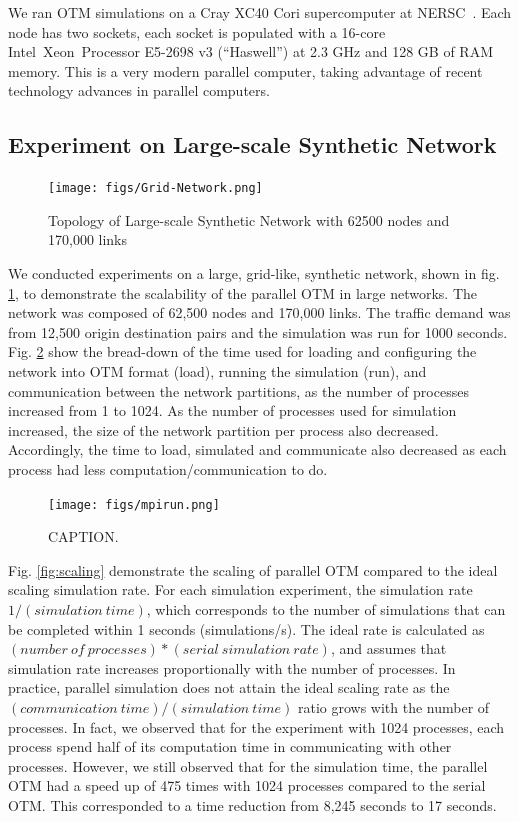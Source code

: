 We ran OTM simulations on a Cray XC40 Cori supercomputer at NERSC~\cite{Cori}. Each node has two sockets, each socket is
populated with a 16-core Intel\textcopyright~Xeon\texttrademark~Processor E5-2698 v3 (``Haswell'') at 2.3 GHz and 128 GB of RAM memory. This is a very modern parallel computer, taking advantage of recent technology advances in parallel computers.

\subsection{Experiment on Large-scale Synthetic Network}
\begin{figure}[h!]
    \centering
    \texttt{[image: figs/Grid-Network.png]}
    \caption{Topology of Large-scale Synthetic Network with 62500 nodes and 170,000 links}
    \label{fig:Synthetic_Network}
\end{figure}

We conducted experiments on a large, grid-like, synthetic network, shown in fig. \ref{fig:Synthetic_Network}, to demonstrate the scalability of the parallel OTM in large networks. The network was composed of 62,500 nodes and 170,000 links. The traffic demand was from 12,500 origin destination pairs and the simulation was run for 1000 seconds. Fig. \ref{fig:mpirun} show the bread-down of the time used for loading and configuring the network into OTM format (load), running the simulation (run), and communication between the network partitions, as the number of processes increased from 1 to 1024. As the number of processes used for simulation increased, the size of the network partition per process also decreased. Accordingly, the time to load, simulated and communicate also decreased as each process had less computation/communication to do.

\begin{figure}[h!]
    \centering
    \texttt{[image: figs/mpirun.png]}
    \caption{CAPTION.}
    \label{fig:mpirun}
\end{figure}
Fig. \ref{fig:scaling} demonstrate the scaling of parallel OTM compared to the ideal scaling simulation rate. For each simulation experiment, the simulation rate $1/(simulation \:time)$, which corresponds to the number of simulations that can be completed within 1 seconds (simulations/s). The ideal rate is calculated as $(number\: of\: processes)*(serial\: simulation\: rate)$, and assumes that simulation rate increases proportionally with the number of processes. In practice, parallel simulation does not attain the ideal scaling rate as the $(communication\:time)/(simulation\:time)$ ratio grows with the number of processes. In fact, we observed that for the experiment with 1024 processes, each process spend half of its computation time in communicating with other processes. However, we still observed that for the simulation time, the parallel OTM had a speed up of 475 times with 1024 processes compared to the serial OTM. This corresponded to a time reduction from 8,245 seconds to 17 seconds.

